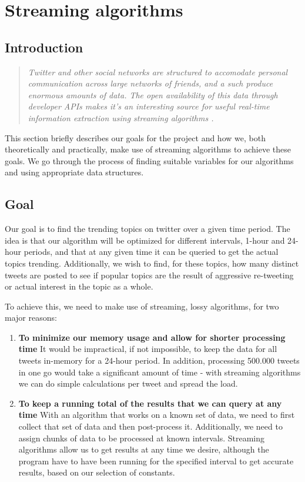 \section{Streaming algorithms}\label{related work}
\subsection{Introduction}\label{algo-intro}
\begin{quote}\textit{
Twitter and other social networks are structured to accomodate personal communication across large networks of friends, and a such produce enormous amounts of data. The open availability of this data through developer APIs makes it's an interesting source for useful real-time information extraction using streaming algorithms \cite{genderprediction}. 
}
\end{quote}

This section briefly describes our goals for the project and how we, both theoretically and practically, make use of streaming algorithms to achieve these goals. We go through the process of finding suitable variables for our algorithms and using appropriate data structures.

\subsection{Goal}\label{algo-goals}
Our goal is to find the trending topics on twitter over a given time period. The idea is that our algorithm will be optimized for different intervals, 1-hour and 24-hour periods, and that at any given time it can be queried to get the actual topics trending. Additionally, we wish to find, for these topics, how many distinct tweets are posted to see if popular topics are the result of aggressive re-tweeting or actual interest in the topic as a whole.

To achieve this, we need to make use of streaming, lossy algorithms, for two major reasons:
\begin{enumerate}
    \item \textbf{To minimize our memory usage and allow for shorter processing time}
        It would be impractical, if not impossible, to keep the data for all tweets in-memory for a 24-hour period. In addition, processing 500.000 tweets in one go would take a significant amount of time - with streaming algorithms we can do simple calculations per tweet and spread the load.

    \item \textbf{To keep a running total of the results that we can query at any time}
        With an algorithm that works on a known set of data, we need to first collect that set of data and then post-process it. Additionally, we need to assign chunks of data to be processed at known intervals. Streaming algorithms allow us to get results at any time we desire, although the program have to have been running for the specified interval to get accurate results, based on our selection of constants.
\end{enumerate}

